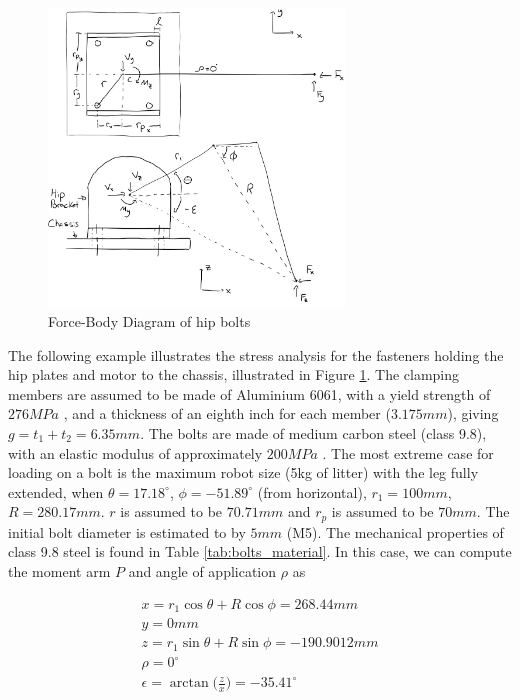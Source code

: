 \begin{figure}
    \centering
    \includegraphics[width=0.7\textwidth]{4_Analysis/img/Bolts/BoltsHipFBD.png}
    \caption{Force-Body Diagram of hip bolts}
    \label{fig:bolt_fbd_hip}
\end{figure}

The following example illustrates the stress analysis for the fasteners holding the hip plates and motor to the chassis, illustrated in Figure \ref{fig:bolt_fbd_hip}.
The clamping members are assumed to be made of Aluminium 6061, with a yield strength of $276MPa$ \cite{matweb_aluminum_nodate}, and a thickness of an eighth inch for each member ($3.175mm$), giving $g = t_1+t_2 = 6.35mm$.
The bolts are made of medium carbon steel (class 9.8), with an elastic modulus of approximately $200MPa$ \cite{azom_aisi_2012}.
The most extreme case for loading on a bolt is the maximum robot size (5kg of litter) with the leg fully extended, when $\theta = 17.18^{\circ}$, $\phi=-51.89^{\circ}$ (from horizontal), $r_1 = 100mm$, $R = 280.17mm$.
$r$ is assumed to be $70.71mm$ and $r_p$ is assumed to be $70mm$.
The initial bolt diameter is estimated to by $5mm$ (M5).
The mechanical properties of class 9.8 steel is found in Table \ref{tab:bolts_material}.
In this case, we can compute the moment arm $P$ and angle of application $\rho$ as

\begin{gather}
    x = r_1 \cos{\theta} + R\cos{\phi} = 268.44 mm
    \\
    y =  0 mm
    \\
    z = r_1 \sin{\theta} + R\sin{\phi} = -190.9012 mm
    \\
    \rho = 0^{\circ}
    \\
    \epsilon = \arctan \big( \frac{z}{x} \big) = -35.41^{\circ}
\end{gather}{}


